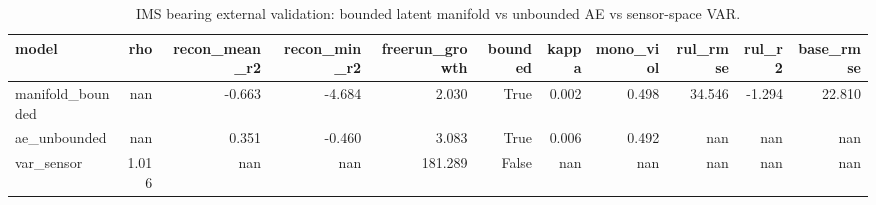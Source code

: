 \begin{table}[t]
\centering
\caption{IMS bearing external validation: bounded latent manifold vs unbounded AE vs sensor-space VAR.}
\label{tab:ims_bearing}
\begin{tabular}{lrrrrrrrrrr}
\toprule
model & rho & recon\_mean\_r2 & recon\_min\_r2 & freerun\_growth & bounded & kappa & mono\_viol & rul\_rmse & rul\_r2 & base\_rmse \\
\midrule
manifold\_bounded & nan & -0.663 & -4.684 & 2.030 & True & 0.002 & 0.498 & 34.546 & -1.294 & 22.810 \\
ae\_unbounded & nan & 0.351 & -0.460 & 3.083 & True & 0.006 & 0.492 & nan & nan & nan \\
var\_sensor & 1.016 & nan & nan & 181.289 & False & nan & nan & nan & nan & nan \\
\bottomrule
\end{tabular}
\end{table}
